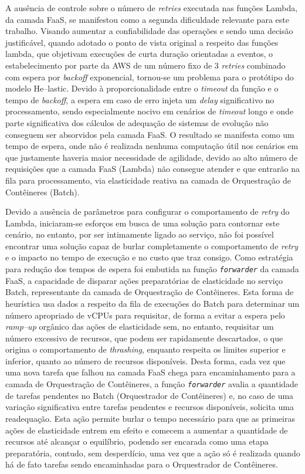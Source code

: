 \documentclass[english,brazilian]{UNISINOSmonografia} %
\begin{document}
A ausência de controle sobre o número de \textit{retries} executada nas funções Lambda, da camada FaaS, se manifestou como a segunda dificuldade relevante para este trabalho.
%
Visando aumentar a confiabilidade das operações e sendo uma decisão justificável, quando adotado o ponto de vista original a respeito das funções lambda, que objetivam execuções de curta duração orientadas a eventos, o estabelecimento por parte da AWS de um número fixo de 3 \textit{retries} combinado com espera por \textit{backoff} exponencial, tornou-se um problema para o protótipo do modelo \textsf{He}--lastic.
%
Devido à proporcionalidade entre o \textit{timeout} da função e o tempo de \textit{backoff}, a espera em caso de erro injeta um \textit{delay} significativo no processamento, sendo especialmente nocivo em cenários de \textit{timeout} longo e onde parte significativa dos cálculos de adequação de sistemas de evolução não conseguem ser absorvidos pela camada FaaS.
%
O resultado se manifesta como um tempo de espera, onde não é realizada nenhuma computação útil nos cenários em que justamente haveria maior necessidade de agilidade, devido ao alto número de requisições que a camada FaaS (Lambda) não consegue atender e que entrarão na fila para processamento, via elasticidade reativa na camada de Orquestração de Contêineres (Batch).



Devido a ausência de parâmetros para configurar o comportamento de \textit{retry} do Lambda, iniciaram-se esforços em busca de uma solução para contornar este cenário, no entanto, por ser intimamente ligado ao serviço, não foi possível encontrar uma solução capaz de burlar completamente o comportamento de \textit{retry} e o impacto no tempo de execução e no custo que traz consigo.
%
Como estratégia para redução dos tempos de espera foi embutida na função \texttt{\textit{forwarder}} da camada FaaS, a capacidade de disparar ações preparatórias de elasticidade no serviço Batch, representante da camada de Orquestração de Contêineres.
%
Esta forma de heurística usa dados a respeito da fila de execuções do Batch para determinar um número apropriado de vCPUs para requisitar, de forma a evitar a espera pelo \textit{ramp--up} orgânico das ações de elasticidade sem, no entanto, requisitar um número excessivo de recursos, que podem ser rapidamente descartados, o que origina o comportamento de \textit{thrashing}, enquanto respeita os limites superior e inferior, quanto ao número de recursos disponíveis.
%
Desta forma, cada vez que uma nova tarefa que falhou na camada FaaS chega para encaminhamento para a camada de Orquestração de Contêineres, a função \texttt{\textit{forwarder}} avalia a quantidade de tarefas pendentes no Batch (Orquestrador de Contêineres) e, no caso de uma variação significativa entre tarefas pendentes e recursos disponíveis, solicita uma readequação.
%
Esta ação permite burlar o tempo necessário para que as primeiras ações de elasticidade entrem em efeito e comecem a aumentar a quantidade de recursos até alcançar o equilíbrio, podendo ser encarada como uma etapa preparatória, contudo, sem desperdício, uma vez que a ação só é realizada quando há de fato tarefas sendo encaminhadas para o Orquestrador de Contêineres.
\end{document}
